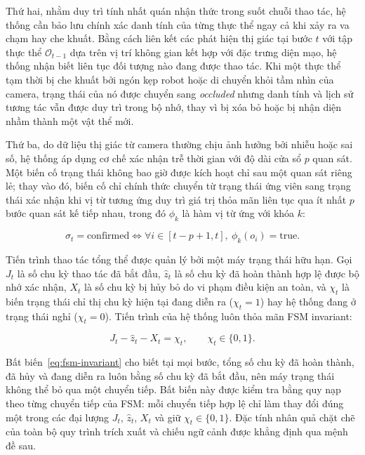 Thứ hai, nhằm duy trì tính nhất quán nhận thức trong suốt chuỗi thao tác, hệ thống cần bảo lưu chính xác danh tính của từng thực thể ngay cả khi xảy ra va chạm hay che khuất. Bằng cách liên kết các phát hiện thị giác tại bước $t$ với tập thực thể $\mathcal O_{t-1}$ dựa trên vị trí không gian kết hợp với đặc trưng diện mạo, hệ thống nhận biết liên tục đối tượng nào đang được thao tác. Khi một thực thể tạm thời bị che khuất bởi ngón kẹp robot hoặc di chuyển khỏi tầm nhìn của camera, trạng thái của nó được chuyển sang \textit{occluded} nhưng danh tính và lịch sử tương tác vẫn được duy trì trong bộ nhớ, thay vì bị xóa bỏ hoặc bị nhận diện nhầm thành một vật thể mới.

Thứ ba, do dữ liệu thị giác từ camera thường chịu ảnh hưởng bởi nhiễu hoặc sai số, hệ thống áp dụng cơ chế xác nhận trễ thời gian với độ dài cửa sổ $p$ quan sát. Một biến cố trạng thái không bao giờ được kích hoạt chỉ sau một quan sát riêng lẻ; thay vào đó, biến cố chỉ chính thức chuyển từ trạng thái ứng viên sang trạng thái xác nhận khi vị từ tương ứng duy trì giá trị thỏa mãn liên tục qua ít nhất $p$ bước quan sát kế tiếp nhau, trong đó $\phi_k$ là hàm vị từ ứng với khóa $k$:

\begin{equation}
\sigma_t = \text{confirmed} \iff \forall i \in [t - p + 1, t],\ \phi_k(o_i) = \text{true}.
\label{eq:temporal-hysteresis}
\end{equation}

Tiến trình thao tác tổng thể được quản lý bởi một máy trạng thái hữu hạn. Gọi $J_t$ là số chu kỳ thao tác đã bắt đầu, $\hat z_t$ là số chu kỳ đã hoàn thành hợp lệ được bộ nhớ xác nhận, $X_t$ là số chu kỳ bị hủy bỏ do vi phạm điều kiện an toàn, và $\chi_t$ là biến trạng thái chỉ thị chu kỳ hiện tại đang diễn ra ($\chi_t = 1$) hay hệ thống đang ở trạng thái nghỉ ($\chi_t = 0$). Tiến trình của hệ thống luôn thỏa mãn FSM invariant:

\begin{equation}
J_t - \hat z_t - X_t = \chi_t,\qquad \chi_t \in \{0, 1\}.
\label{eq:fsm-invariant}
\end{equation}

Bất biến~\eqref{eq:fsm-invariant} cho biết tại mọi bước, tổng số chu kỳ đã hoàn thành, đã hủy và đang diễn ra luôn bằng số chu kỳ đã bắt đầu, nên máy trạng thái không thể bỏ qua một chuyển tiếp. Bất biến này được kiểm tra bằng quy nạp theo từng chuyển tiếp của FSM: mỗi chuyển tiếp hợp lệ chỉ làm thay đổi đúng một trong các đại lượng $J_t$, $\hat z_t$, $X_t$ và giữ $\chi_t \in \{0,1\}$. Đặc tính nhân quả chặt chẽ của toàn bộ quy trình trích xuất và chiếu ngữ cảnh được khẳng định qua mệnh đề sau.

